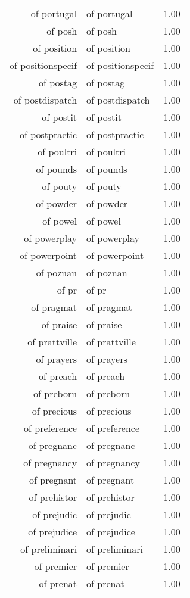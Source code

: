 \begin{table}[ht]
\begin{tabular}{rlr}
  of portugal & of portugal & 1.00 \\ 
  of posh & of posh & 1.00 \\ 
  of position & of position & 1.00 \\ 
  of positionspecif & of positionspecif & 1.00 \\ 
  of postag & of postag & 1.00 \\ 
  of postdispatch & of postdispatch & 1.00 \\ 
  of postit & of postit & 1.00 \\ 
  of postpractic & of postpractic & 1.00 \\ 
  of poultri & of poultri & 1.00 \\ 
  of pounds & of pounds & 1.00 \\ 
  of pouty & of pouty & 1.00 \\ 
  of powder & of powder & 1.00 \\ 
  of powel & of powel & 1.00 \\ 
  of powerplay & of powerplay & 1.00 \\ 
  of powerpoint & of powerpoint & 1.00 \\ 
  of poznan & of poznan & 1.00 \\ 
  of pr & of pr & 1.00 \\ 
  of pragmat & of pragmat & 1.00 \\ 
  of praise & of praise & 1.00 \\ 
  of prattville & of prattville & 1.00 \\ 
  of prayers & of prayers & 1.00 \\ 
  of preach & of preach & 1.00 \\ 
  of preborn & of preborn & 1.00 \\ 
  of precious & of precious & 1.00 \\ 
  of preference & of preference & 1.00 \\ 
  of pregnanc & of pregnanc & 1.00 \\ 
  of pregnancy & of pregnancy & 1.00 \\ 
  of pregnant & of pregnant & 1.00 \\ 
  of prehistor & of prehistor & 1.00 \\ 
  of prejudic & of prejudic & 1.00 \\ 
  of prejudice & of prejudice & 1.00 \\ 
  of preliminari & of preliminari & 1.00 \\ 
  of premier & of premier & 1.00 \\ 
  of prenat & of prenat & 1.00 \\ 

\end{tabular}
\end{table}
